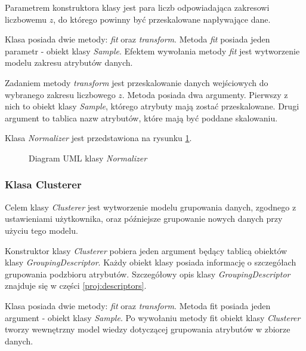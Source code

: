 \documentclass[../thesis.tex]{subfiles}
\begin{document}
Parametrem konstruktora klasy jest para liczb odpowiadająca zakresowi liczbowemu $z$, do którego powinny być przeskalowane napływające dane.

Klasa posiada dwie metody: \emph{fit} oraz \emph{transform}. Metoda \emph{fit} posiada jeden parametr - obiekt klasy \emph{Sample}. Efektem wywołania metody \emph{fit} jest wytworzenie modelu zakresu atrybutów danych. 

Zadaniem metody \emph{transform} jest przeskalowanie danych wejściowych do wybranego zakresu liczbowego $z$. Metoda posiada dwa argumenty. Pierwszy z nich to obiekt klasy \emph{Sample}, którego atrybuty mają zostać przeskalowane. Drugi argument to tablica nazw atrybutów, które mają być poddane skalowaniu.

Klasa \emph{Normalizer} jest przedstawiona na rysunku \ref{proj:diagram_normalizer}.

\begin{figure}[h]
\centering
{}
\caption{Diagram UML klasy \emph{Normalizer}}
\label{proj:diagram_normalizer}
\end{figure}

\subsubsection{Klasa Clusterer}

Celem klasy \emph{Clusterer} jest wytworzenie modelu grupowania danych, zgodnego z ustawieniami użytkownika, oraz późniejsze grupowanie nowych danych przy użyciu tego modelu. 

Konstruktor klasy \emph{Clusterer} pobiera jeden argument będący tablicą obiektów klasy \emph{GroupingDescriptor}. Każdy obiekt klasy posiada informację o szczegółach grupowania podzbioru atrybutów. Szczegółowy opis klasy \emph{GroupingDescriptor} znajduje się w części \ref{proj:descriptors}.

Klasa posiada dwie metody: \emph{fit} oraz \emph{transform}. Metoda fit posiada jeden argument - obiekt klasy \emph{Sample}. Po wywołaniu metody fit obiekt klasy \emph{Clusterer} tworzy wewnętrzny model wiedzy dotyczącej grupowania atrybutów w zbiorze danych.
\end{document}
